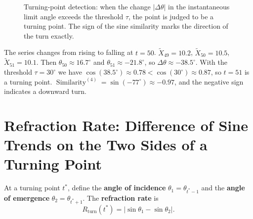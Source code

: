 \begin{figure}[htbp]
\centering
{}
\caption{Turning-point detection: when the change $|\Delta\theta|$ in the instantaneous limit angle exceeds the threshold $\tau$, the point is judged to be a turning point. The sign of the sine similarity marks the direction of the turn exactly.}
\label{fig:turning_point_detection}
\end{figure}

\begin{example}\label{ex:ts_turning_example}
The series changes from rising to falling at $t=50$. $\tilde{X}_{49} = 10.2$, $\tilde{X}_{50} = 10.5$, $\tilde{X}_{51} = 10.1$. Then $\theta_{50} \approx 16.7^\circ$ and $\theta_{51} \approx -21.8^\circ$, so $\Delta\theta \approx -38.5^\circ$. With the threshold $\tau = 30^\circ$ we have $\cos(38.5^\circ) \approx 0.78 < \cos(30^\circ) \approx 0.87$, so $t=51$ is a turning point. $\operatorname{Similarity}^{(4)} = \sin(-77^\circ) \approx -0.97$, and the negative sign indicates a downward turn.
\end{example}

\section{Refraction Rate: Difference of Sine Trends on the Two Sides of a Turning Point}

\begin{definition}\label{def:ts_refraction}
At a turning point $t^*$, define the \textbf{angle of incidence} $\theta_1 = \theta_{t^*-1}$ and the \textbf{angle of emergence} $\theta_2 = \theta_{t^*+1}$. The \textbf{refraction rate} is
\[
R_{\text{turn}}(t^*) = |\sin\theta_1 - \sin\theta_2|.
\]
\end{definition}

